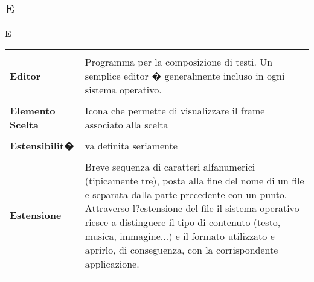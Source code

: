 {\subsection{E} 
\hfill\Huge{\textbf{E}} \\ 
\normalsize 
\begin{longtabu} to 
\toprule \\ 
\textbf{Editor} & Programma per la composizione di testi. Un semplice editor � generalmente incluso in ogni sistema operativo. \\ 
 \\ 
\textbf{Elemento Scelta} & Icona che permette di visualizzare il frame associato alla scelta \\ 
 \\ 
\textbf{Estensibilit�} & va definita seriamente \\ 
 \\ 
\textbf{Estensione} & Breve sequenza di caratteri alfanumerici (tipicamente tre), posta alla fine del nome di un file e separata dalla parte precedente con un punto. Attraverso l?estensione del file il sistema operativo riesce a distinguere il tipo di contenuto (testo, musica, immagine...) e il formato utilizzato e aprirlo, di conseguenza, con la corrispondente applicazione. \\ 
 \\ 
\end{longtabu} 
\newpage 
}
